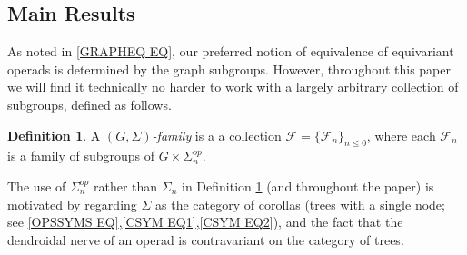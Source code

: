 \documentclass[a4paper,10pt
,draft
]{article}%
\numberwithin{equation}{section}
\numberwithin{figure}{section}
\theoremstyle{definition} %
\newtheorem{definition}[equation]{Definition}%
\newcommand{\1}{\ensuremath{\mathbbm 1}}%
\begin{document}
\subsection{Main Results}


As noted in \eqref{GRAPHEQ EQ},
our preferred notion of equivalence of equivariant operads is determined by the graph subgroups.
However, throughout this paper we will find it technically 
no harder to work with a largely arbitrary collection of subgroups,
defined as follows.


\begin{definition}\label{FAM1ST DEF}
	A \emph{$(G,\Sigma)$-family} is a
	a collection
	$\mathcal{F} = \{\mathcal{F}_n\}_{n \leq 0}$,
	where each $\mathcal{F}_n$
	is a family of subgroups of $G \times \Sigma_n^{op}$.
\end{definition}

The use of $\Sigma_n^{op}$ rather than $\Sigma_n$
in Definition \ref{FAM1ST DEF} 
(and throughout the paper) 
is motivated by regarding $\Sigma$
as the category of corollas (trees with a single node; 
see \eqref{OPSSYMS EQ},\eqref{CSYM EQ1},\eqref{CSYM EQ2}),
and the fact that the dendroidal nerve \cite[\S 1]{MW07} of an operad is contravariant on the category of trees.


\end{document}
